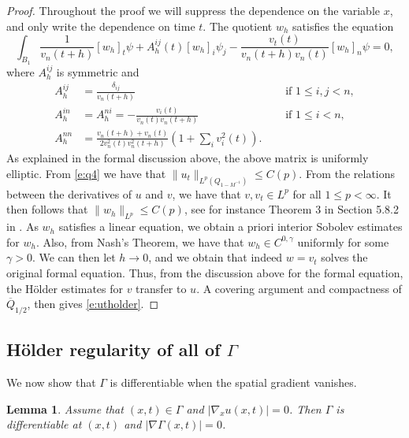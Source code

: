 \documentclass{amsart}
\newtheorem{lemma}[theorem]{Lemma}
\numberwithin{equation}{section}
\begin{document}
\begin{proof}
Throughout the proof we will suppress the dependence on the variable $x$, and only write the dependence on time $t$. The quotient $w_h$ satisfies the equation
\[
\int_{B_1} \frac{1}{v_n(t+h)} [w_h]_t \psi 
+ A^{ij}_h(t) [w_h]_i \psi_j 
- \frac{v_t(t)}{v_n(t+h)v_n(t)} [w_h]_n \psi=0, 
\]
where $A^{ij}_h$ is symmetric and 
\[
 \begin{aligned}
 A_h^{ij}&= \frac{\delta_{ij}}{v_n(t+h)}  &\quad \text{ if } 1\leq i,j <n, \\
 A_h^{in}&=A_h^{ni}=  -\frac{v_i(t)}{v_n(t)v_n(t+h)} &\quad \text{ if } 1\leq i <n, \\
 A_h^{nn}&= \frac{v_n(t+h)+v_n(t)}{2v_n^2(t)v_n^2(t+h)}(1 + \sum_i v_i^2(t)).
 \end{aligned}
\]
As explained in the formal discussion above, the above matrix is uniformly elliptic. From \eqref{e:q4} we have that $\| u_t \|_{L^p(Q_{1-M^{-1}})} \leq C(p)$. From the relations between the derivatives of $u$ and $v$, we have that $v,v_t \in L^p$ for all $1\leq p < \infty$. It then follows that $\| w_h \|_{L^p} \leq C(p)$, see for instance Theorem 3 in Section 5.8.2 in \cite{e10}. As $w_h$ satisfies a linear equation, we obtain a priori interior Sobolev estimates for $w_h$. Also, from Nash's Theorem, we have that $w_h \in C^{0,\gamma}$ uniformly for some $\gamma>0$. We can then let $h\to 0$, and we obtain that indeed $w=v_t$ solves the original formal equation. Thus, from the discussion above for the formal equation, the H\"older estimates for $v$ transfer to $u$. A covering argument and compactness of $\overline{Q}_{1/2}$, then gives \eqref{e:utholder}.
\end{proof}



\subsection{H\"older regularity of all of $\Gamma$} \label{s:allholder}
We now show that $\Gamma$ is differentiable when the spatial gradient vanishes.
\begin{lemma} \label{l:zeroder}
 Assume that $(x,t) \in \Gamma$ and $|\nabla_x u(x,t)|=0$. Then $\Gamma$ is differentiable at $(x,t)$ and $|\nabla \Gamma(x,t)|=0$. 
\end{lemma}
\end{document}
